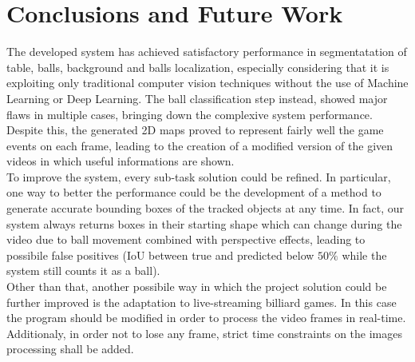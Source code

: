 \section{Conclusions and Future Work}


The developed system has achieved satisfactory performance in segmentatation of table, balls, background and balls localization, especially considering 
that it is exploiting only traditional computer vision techniques without the use of Machine Learning or Deep Learning.
The ball classification step instead, showed major flaws in multiple cases, bringing down the complexive system performance. 
Despite this, the generated 2D maps proved to represent fairly well the game events on each frame, leading to the creation of a modified version
of the given videos in which useful informations are shown. 
\newline \\
To improve the system, every sub-task solution could be refined.
In particular, one way to better the performance could be the development of a method to generate accurate bounding boxes
of the tracked objects at any time. In fact, our system always returns boxes in their starting shape which can change during the video due to ball
movement combined with perspective effects, leading to possibile false positives (IoU between true and predicted below $50\%$ while the system still 
counts it as a ball).
\newline \\
Other than that, another possibile way in which the project solution could be further improved is the adaptation to live-streaming billiard games. In this case the program should be modified
in order to process the video frames in real-time. Additionaly, in order not to lose any frame, strict time constraints on the images processing shall be added. 
